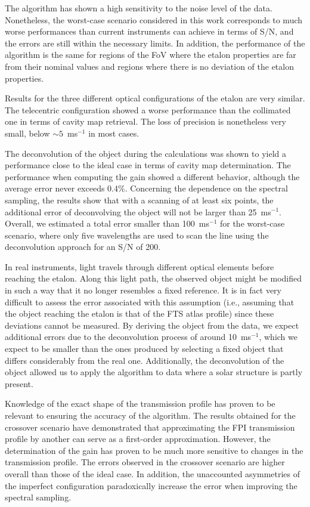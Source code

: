The algorithm has shown a high sensitivity to the noise level of the data. Nonetheless, the worst-case scenario considered in this work corresponds to much worse performances than current instruments can achieve in terms of S/N, and the errors are still within the necessary limits. In addition, the performance of the algorithm is the same for regions of the FoV where the etalon properties are far from their nominal values and regions where there is no deviation of the etalon properties. 

Results for the three different optical configurations of the etalon are very similar. The telecentric configuration showed a worse performance than the collimated one in terms of cavity map retrieval. The loss of precision is nonetheless very small, below $\sim 5$~ms$^{-1}$ in most cases. 

The deconvolution of the object during the calculations was shown to yield a performance close to the ideal case in terms of cavity map determination. The performance when computing the gain showed a different behavior, although the average error never exceeds 0.4\%. Concerning the dependence on the spectral sampling, the results show that with a scanning of at least six points, the additional error of deconvolving the object will not be larger than 25~ms$^{-1}$. Overall, we estimated a total error smaller than 100~ms$^{-1}$ for the worst-case scenario, where only five wavelengths are used to scan the line using the deconvolution approach for an S/N of 200.

In real instruments, light travels through different optical elements before reaching the etalon. Along this light path, the observed object might be modified in such a way that it no longer resembles a fixed reference. It is in fact very difficult to assess the error associated with this assumption (i.e., assuming that the object reaching the etalon is that of the FTS atlas profile) since these deviations cannot be measured. By deriving the object from the data, we expect additional errors due to the deconvolution process of around 10~ms$^{-1}$, which we expect to be smaller than the ones produced by selecting a fixed object that differs considerably from the real one. Additionally, the deconvolution of the object allowed us to apply the algorithm to data where a solar structure is partly present.

Knowledge of the exact shape of the transmission profile has proven to be relevant to ensuring the accuracy of the algorithm. The results obtained for the crossover scenario have demonstrated that approximating the FPI transmission profile by another can serve as a first-order approximation. However, the determination of the gain has proven to be much more sensitive to changes in the transmission profile. The errors observed in the crossover scenario are higher overall than those of the ideal case. In addition, the unaccounted asymmetries of the imperfect configuration paradoxically increase the error when improving the spectral sampling.


